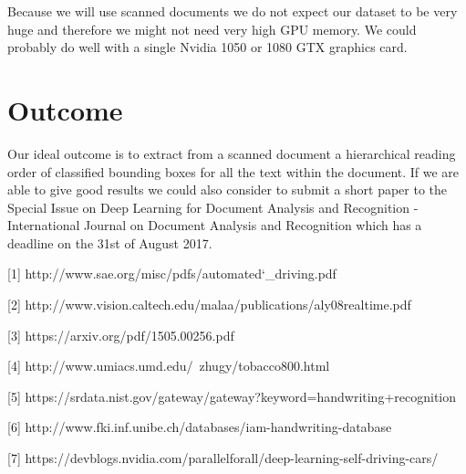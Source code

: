 \documentclass[10pt,twocolumn,letterpaper]{article}
\begin{document}
	Because we will use scanned documents we do not expect our dataset to be very huge and therefore we might not need very high GPU memory. We could probably do well with a single Nvidia 1050 or 1080 GTX graphics card. 
	
	\section{Outcome}
	Our ideal outcome is to extract from a scanned document a hierarchical reading order of classified bounding boxes for all the text within the document. If we are able to give good results we could also consider to submit a short paper to the Special Issue on Deep Learning for Document Analysis and Recognition - International Journal on Document Analysis and Recognition which has a deadline on the 31st of August 2017.
	{\small
		
		
		
		[1] http://www.sae.org/misc/pdfs/automated\char`_driving.pdf
		
		[2] http://www.vision.caltech.edu/malaa/publications/aly08realtime.pdf
		
		[3] https://arxiv.org/pdf/1505.00256.pdf
		
		[4] http://www.umiacs.umd.edu/~zhugy/tobacco800.html
		
		[5] https://srdata.nist.gov/gateway/gateway?keyword=handwriting+recognition
		
		
		[6] http://www.fki.inf.unibe.ch/databases/iam-handwriting-database

		[7] https://devblogs.nvidia.com/parallelforall/deep-learning-self-driving-cars/		
						
				
	}
	
\end{document}
